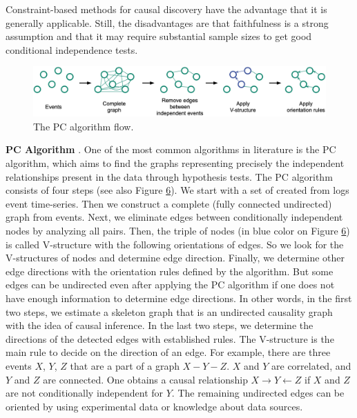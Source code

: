 Constraint-based methods for causal discovery have the advantage that it is generally applicable. Still, the disadvantages are that faithfulness is a strong assumption and that it may require substantial sample sizes to get good conditional independence tests.
\begin{figure}[H]
\centering
    \label{fig:pc}
    \includegraphics[width=\textwidth]{figures/pc.png}
    \caption{The PC algorithm flow.}
\end{figure}
\textbf{PC Algorithm} \cite{spirtes2000causation}. One of the most common algorithms in literature is the PC algorithm, which aims to find the graphs representing precisely the independent relationships present in the data through hypothesis tests. The PC algorithm consists of four steps (see also Figure \hyperref[fig:pc]{6}). We start with a set of created from logs event time-series. Then we construct a complete (fully connected undirected) graph from events. Next, we eliminate edges between conditionally independent nodes by analyzing all pairs. Then, the triple of nodes (in blue color on Figure \hyperref[fig:pc]{6}) is called V-structure with the following orientations of edges. So we look for the V-structures of nodes and determine edge direction. Finally, we determine other edge directions with the orientation rules defined by the algorithm. But some edges can be undirected even after applying the PC algorithm if one does not have enough information to determine edge directions. In other words, in the first two steps, we estimate a skeleton graph that is an undirected causality graph with the idea of causal inference. In the last two steps, we determine the directions of the detected edges with established rules. The V-structure is the main rule to decide on the direction of an edge. For example, there are three events $X$, $Y$, $Z$ that are a part of a graph $X-Y-Z$. $X$ and $Y$ are correlated, and $Y$ and $Z$ are connected. One obtains a causal relationship $X \rightarrow Y \leftarrow Z$ if $X$ and $Z$ are not conditionally independent for $Y$. The remaining undirected edges can be oriented by using experimental data or knowledge about data sources. \newline

